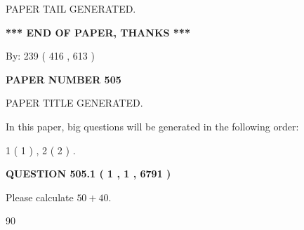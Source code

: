 \documentclass[12pt]{article}
\begin{document}
   
   
\vspace{2.0in} PAPER TAIL GENERATED.
   
   
   
   
\vspace{1.0in} 
{\textbf{\large{ *** END OF PAPER, THANKS *** }}} 
   
   
\hspace{1.0in} By: 
 239 ( 416 ,  613 )
   
   
   
   
\newpage 
\setcounter{page}{ 
   505001 } 
   
   
   
   
 {\textbf{ \Large{ PAPER NUMBER  505  }}}
   
   
\vspace{0.2in}
   
   
   
   
   
   
   
   
 \vspace{0.2in}
 
 
 
 
   
   
 PAPER TITLE GENERATED.
   
   
   
\vspace{0.2in}
   
In this paper, big questions will be generated in the following order: 
   
   
   1 ( 1 )
 ,
   2 ( 2 )
 .
  
\vspace{0.2in}
  
{\textbf{\Large{QUESTION
505.1 
 ( 1 , 1 , 6791 )
}}}
  
  
 
Please calculate $ %
50 +  %
40 $.
 
 
 
\noindent{}
 
 

90
 
 
\noindent{}
 
 

 
 
 
\noindent{}
 
\end{document}
